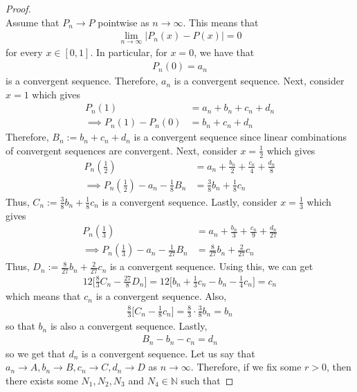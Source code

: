 \documentclass[10pt,a4paper]{article}
\theoremstyle{definition}
\theoremstyle{definition}
\numberwithin{equation}{section}
\begin{document}
\begin{proof}$ $
\\Assume that $P_n \to P$ pointwise as $n \to \infty$. This means that 
\begin{align*}
\lim_{n \to \infty} |P_n(x) - P(x)| = 0
\end{align*}
for every $x \in [0, 1]$. In particular, for $x = 0$, we have that 
\begin{align*}
P_n(0) = a_n
\end{align*}
is a convergent sequence. Therefore, $a_n$ is a convergent sequence. Next, consider $x = 1$ which gives
\begin{align*}
P_n(1) &= a_n + b_n + c_n + d_n\\
\implies P_n(1) - P_n(0) &= b_n + c_n + d_n
\end{align*}
Therefore, $B_n := b_n + c_n + d_n$ is a convergent sequence since linear combinations of convergent sequences are convergent. Next, consider $x = \frac{1}{2}$ which gives
\begin{align*}
P_n\left(\frac{1}{2}\right) &= a_n + \frac{b_n}{2} + \frac{c_n}{4} + \frac{d_n}{8}\\
\implies P_n\left(\frac{1}{2}\right) - a_n - \frac{1}{8}B_n &= \frac{3}{8}b_n + \frac{1}{8}c_n
\end{align*}
Thus, $C_n := \frac{3}{8}b_n + \frac{1}{8}c_n$ is a convergent sequence. Lastly, consider $x = \frac{1}{3}$ which gives
\begin{align*}
P_n\left(\frac{1}{3}\right) &= a_n + \frac{b_n}{3} + \frac{c_n}{9} + \frac{d_n}{27}\\
\implies P_n\left(\frac{1}{3}\right) - a_n - \frac{1}{27}B_n &= \frac{8}{27}b_n + \frac{2}{27}c_n
\end{align*}
Thus, $D_n := \frac{8}{27}b_n + \frac{2}{27}c_n$ is a convergent sequence. Using this, we can get
\begin{align*}
12 \bigg[\frac{8}{3}C_n - \frac{27}{8}D_n\bigg] = 12 \bigg[ b_n + \frac{1}{3}c_n - b_n - \frac{1}{4}c_n \bigg] = c_n
\end{align*}
which means that $c_n$ is a convergent sequence. Also, 
\begin{align*}
\frac{8}{3}\bigg[ C_n - \frac{1}{8}c_n \bigg] = \frac{8}{3} \cdot \frac{3}{8}b_n = b_n
\end{align*}
so that $b_n$ is also a convergent sequence. Lastly, 
\begin{align*}
B_n - b_n - c_n = d_n
\end{align*}
so we get that $d_n$ is a convergent sequence. Let us say that $a_n \to A, b_n \to B, c_n \to C, d_n \to D$ as $n \to \infty$. Therefore, if we fix some $r > 0$, then there exists some $N_1, N_2, N_3$ and $N_4 \in \mathbb{N}$ such that

\end{proof}
\end{document}
